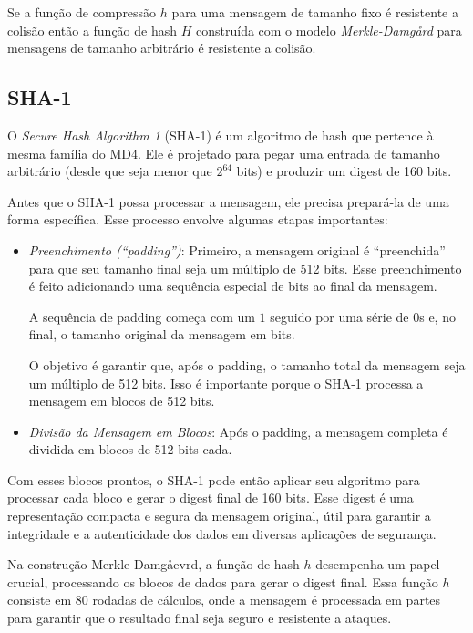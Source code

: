 \begin{theorem}
  Se a função de compressão $h$ para uma mensagem de tamanho fixo é resistente a colisão então a função de hash $H$ construída com o modelo {\em Merkle-Damg\aa rd} para mensagens de tamanho arbitrário é resistente a colisão.
\end{theorem}

\subsection{SHA-1}
\label{sec:sha-1}

O {\em Secure Hash Algorithm 1} (SHA-1) é um algoritmo de hash que pertence à mesma família do MD4.
Ele é projetado para pegar uma entrada de tamanho arbitrário (desde que seja menor que $2^{64}$ bits) e produzir um digest de 160 bits.

Antes que o SHA-1 possa processar a mensagem, ele precisa prepará-la de uma forma específica. Esse processo envolve algumas etapas importantes:

\begin{itemize}
\item[] {\em Preenchimento (``padding'')}:
  Primeiro, a mensagem original é ``preenchida'' para que seu tamanho final seja um múltiplo de 512 bits.
  Esse preenchimento é feito adicionando uma sequência especial de bits ao final da mensagem.

  A sequência de padding começa com um $1$ seguido por uma série de $0$s e, no final, o tamanho original da mensagem em bits.

  O objetivo é garantir que, após o padding, o tamanho total da mensagem seja um múltiplo de 512 bits.
  Isso é importante porque o SHA-1 processa a mensagem em blocos de 512 bits.
\item[] {\em Divisão da Mensagem em Blocos}:
  Após o padding, a mensagem completa é dividida em blocos de 512 bits cada.
\end{itemize}

Com esses blocos prontos, o SHA-1 pode então aplicar seu algoritmo para processar cada bloco e gerar o digest final de 160 bits.
Esse digest é uma representação compacta e segura da mensagem original, útil para garantir a integridade e a autenticidade dos dados em diversas aplicações de segurança.

Na construção Merkle-Damg\aa evrd, a função de hash $h$ desempenha um papel crucial, processando os blocos de dados para gerar o digest final.
Essa função $h$ consiste em 80 rodadas de cálculos, onde a mensagem é processada em partes para garantir que o resultado final seja seguro e resistente a ataques.

